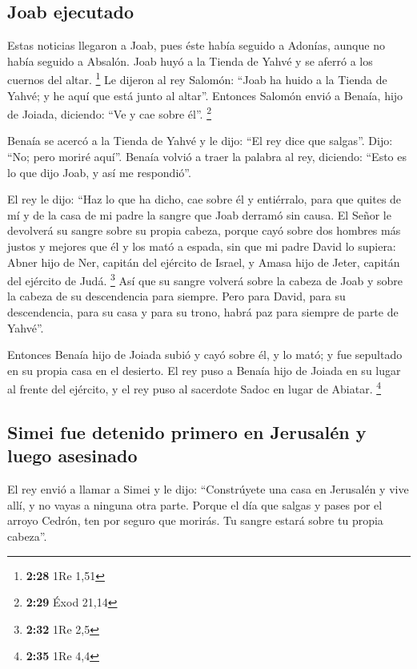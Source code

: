 \hypertarget{joab-ejecutado}{%
\subsection{Joab ejecutado}\label{joab-ejecutado}}

 Estas noticias llegaron a Joab, pues éste había seguido
a Adonías, aunque no había seguido a Absalón. Joab huyó a la Tienda de
Yahvé y se aferró a los cuernos del altar. \footnote{\textbf{2:28} 1Re
  1,51}  Le dijeron al rey Salomón: ``Joab ha huido a la
Tienda de Yahvé; y he aquí que está junto al altar''. Entonces Salomón
envió a Benaía, hijo de Joiada, diciendo: ``Ve y cae sobre él''.
\footnote{\textbf{2:29} Éxod 21,14}

 Benaía se acercó a la Tienda de Yahvé y le dijo: ``El
rey dice que salgas''. Dijo: ``No; pero moriré aquí''. Benaía volvió a
traer la palabra al rey, diciendo: ``Esto es lo que dijo Joab, y así me
respondió''.

 El rey le dijo: ``Haz lo que ha dicho, cae sobre él y
entiérralo, para que quites de mí y de la casa de mi padre la sangre que
Joab derramó sin causa.  El Señor le devolverá su sangre
sobre su propia cabeza, porque cayó sobre dos hombres más justos y
mejores que él y los mató a espada, sin que mi padre David lo supiera:
Abner hijo de Ner, capitán del ejército de Israel, y Amasa hijo de
Jeter, capitán del ejército de Judá. \footnote{\textbf{2:32} 1Re 2,5}
 Así que su sangre volverá sobre la cabeza de Joab y
sobre la cabeza de su descendencia para siempre. Pero para David, para
su descendencia, para su casa y para su trono, habrá paz para siempre de
parte de Yahvé''.

 Entonces Benaía hijo de Joiada subió y cayó sobre él, y
lo mató; y fue sepultado en su propia casa en el desierto.
 El rey puso a Benaía hijo de Joiada en su lugar al
frente del ejército, y el rey puso al sacerdote Sadoc en lugar de
Abiatar. \footnote{\textbf{2:35} 1Re 4,4}

\hypertarget{simei-fue-detenido-primero-en-jerusaluxe9n-y-luego-asesinado}{%
\subsection{Simei fue detenido primero en Jerusalén y luego
asesinado}\label{simei-fue-detenido-primero-en-jerusaluxe9n-y-luego-asesinado}}

 El rey envió a llamar a Simei y le dijo: ``Constrúyete
una casa en Jerusalén y vive allí, y no vayas a ninguna otra parte.
 Porque el día que salgas y pases por el arroyo Cedrón,
ten por seguro que morirás. Tu sangre estará sobre tu propia cabeza''.

